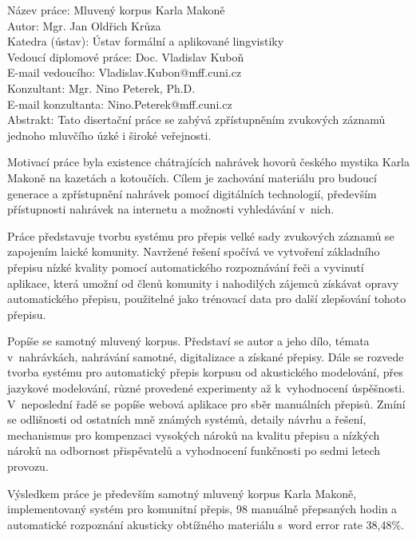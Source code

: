 \noindent Název práce: Mluven\'{y} korpus Karla Makon\v{e}\\
Autor: Mgr. Jan Oldřich Krůza\\
Katedra (ústav): Ústav formální a aplikované lingvistiky\\
Vedoucí diplomové práce: Doc. Vladislav Kuboň\\
E-mail vedoucího: Vladislav.Kubon@mff.cuni.cz\\
Konzultant: Mgr. Nino Peterek, Ph.D.\\
E-mail konzultanta: Nino.Peterek@mff.cuni.cz\\

\noindent Abstrakt: Tato disertační práce se zabývá zpřístupněním zvukových
záznamů jednoho mluvčího úzké i široké veřejnosti.

Motivací práce byla existence chátrajících nahrávek hovorů českého mystika
Karla Makoně na kazetách a kotoučích. Cílem je zachování materiálu pro
budoucí generace a zpřístupnění nahrávek pomocí digitálních technologií,
především přístupnosti nahrávek na internetu a možnosti vyhledávání v~nich.

Práce představuje tvorbu systému pro přepis velké sady zvukových záznamů
se zapojením laické komunity. Navržené řešení spočívá ve vytvoření základního
přepisu nízké kvality pomocí automatického rozpoznávání řeči a vyvinutí
aplikace, která umožní od členů komunity i nahodilých zájemců získávat opravy
automatického přepisu, použitelné jako trénovací data pro další zlepšování
tohoto přepisu.

Popíše se samotný mluvený korpus. Představí se autor a
jeho dílo,
témata v~nahrávkách, nahrávání samotné, digitalizace a získané přepisy.
Dále se rozvede tvorba systému pro automatický
přepis korpusu od akustického modelování, přes jazykové modelování, různé
provedené experimenty až k~vyhodnocení úspěšnosti. V~neposlední řadě se popíše
webová aplikace pro sběr manuálních přepisů. Zmíní se odlišnosti od ostatních mně známých
systémů, detaily návrhu a řešení, mechanismus pro kompenzaci vysokých nároků na kvalitu
přepisu a nízkých nároků na odbornost přispěvatelů a vyhodnocení funkčnosti
po sedmi letech provozu.

Výsledkem práce je především samotný mluvený korpus Karla Makoně,
implementovaný systém pro komunitní přepis, 98 manuálně
přepsaných hodin a automatické rozpoznání akusticky obtížného materiálu
s~word error rate 38,48\%.

\vspace{10mm}


